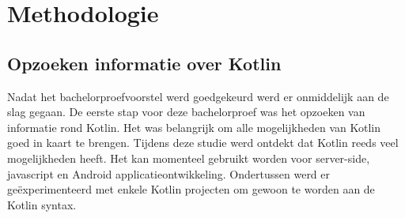 
\chapter{Methodologie}
\label{ch:methodologie}



\section{Opzoeken informatie over Kotlin}
Nadat het bachelorproefvoorstel werd goedgekeurd werd er onmiddelijk aan de slag gegaan. De eerste stap voor deze bachelorproef was het opzoeken van informatie rond Kotlin. Het was belangrijk om alle mogelijkheden van Kotlin goed in kaart te brengen. Tijdens deze studie werd ontdekt dat Kotlin reeds veel mogelijkheden heeft. Het kan momenteel gebruikt worden voor server-side, javascript en Android applicatieontwikkeling. Ondertussen werd er geëxperimenteerd met enkele Kotlin projecten om gewoon te worden aan de Kotlin syntax.

